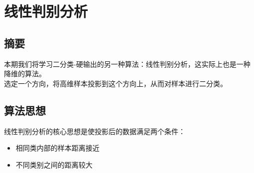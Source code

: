 \documentclass{report}
\begin{document}
\chapter{线性判别分析}
\section{摘要}
本期我们将学习二分类-硬输出的另一种算法：线性判别分析，这实际上也是一种降维的算法。\\
选定一个方向，将高维样本投影到这个方向上，从而对样本进行二分类。
\section{算法思想}
线性判别分析的核心思想是使投影后的数据满足两个条件：
\begin{itemize}
	\item 相同类内部的样本距离接近
	\item 不同类别之间的距离较大
\end{itemize}
\end{document}
